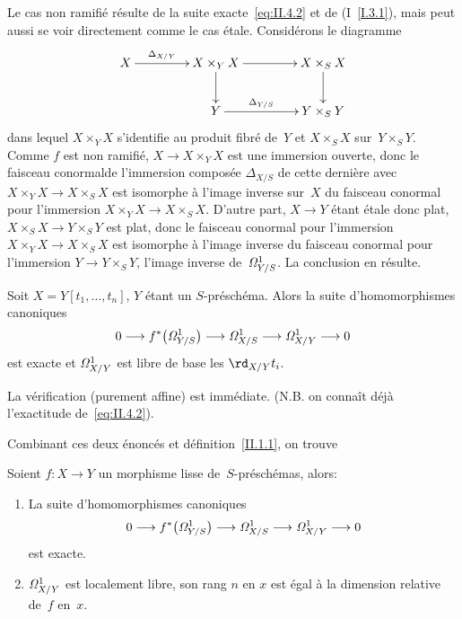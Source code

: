 Le cas non ramifi\'e r\'esulte de la suite
exacte~\eqref{eq:II.4.2} et de (I~\ref{I.3.1}), mais peut aussi se
voir directement comme le cas \'etale. Consid\'erons le diagramme
\begin{equation*}
\xymatrix@C=1.5cm{{X}\ar[r]^-{\Delta_{X/Y}}&{X\times_{Y}X}\ar[d]\ar[r]&{X\times_{S}X}\ar[d]\\ &{Y}\ar[r]^-{\Delta_{Y/S}}&{Y\times_{S}Y}}
\end{equation*}
dans lequel $X\times_{Y}X$ s'identifie au produit fibr\'e de~$Y$ et
$X\times_{S}X$ sur~$Y\times_{S}Y$. Comme $f$ est non ramifi\'e,
$X\to X\times_{Y}X$ est une immersion ouverte, donc le faisceau
\og conormal\fg de l'immersion compos\'ee $\Delta_{X/S}$ de cette
derni\`ere avec $X\times_{Y}X\to X\times_{S}X$ est isomorphe \`a
l'image inverse sur~$X$ du faisceau conormal pour l'immersion
$X\times_{Y}X\to X\times_{S}X$. D'autre part, $X\to Y$ \'etant
\'etale donc plat, $X\times_{S}X\to Y\times_{S}Y$ est plat, donc le
faisceau conormal pour l'immersion $X\times_{Y}X\to X\times_{S}X$ est
isomorphe \`a l'image inverse du faisceau conormal pour l'immersion
$Y\to Y\times_{S}Y$, \ie l'image inverse de~$\it{\Omega}^1_{Y/S}$. La
conclusion en r\'esulte.

\begin{lemme}
\label{II.4.2}
Soit $X=Y[t_{1},\dots,t_{n}]$, $Y$ \'etant un
$S$-pr\'esch\'ema. Alors la suite d'homomorphismes canoniques
$$
0\to f^*\big(\it{\Omega}^1_{Y/S}\big)\to
\it{\Omega}^1_{X/S}\to\it{\Omega}^1_{X/Y}\to 0
$$
est exacte et $\it{\Omega}^1_{X/Y}$ est libre de base les
$\rd_{X/Y}t_{i}$.
\end{lemme}

La v\'erification (purement affine) est imm\'ediate. (N.B. on
conna\^it d\'ej\`a l'exactitude de~\eqref{eq:II.4.2}).

Combinant ces deux \'enonc\'es et d\'efinition~\ref{II.1.1}, on
trouve

\begin{theoreme}
\label{II.4.3}
Soient $f\colon X\to Y$ un morphisme lisse de~$S$-pr\'esch\'emas,
alors:
\begin{enumerate}
\item[(i)] La suite d'homomorphismes canoniques
$$
0\to f^*\big(\it{\Omega}^1_{Y/S}\big)\to
\it{\Omega}^1_{X/S}\to\it{\Omega}^1_{X/Y}\to 0
$$
est exacte.
\item[(ii)] $\it{\Omega}^1_{X/Y}$ est localement libre, son rang $n$
en $x$ est \'egal \`a la dimension relative de~$f$ en~$x$.
\end{enumerate}
\end{theoreme}

